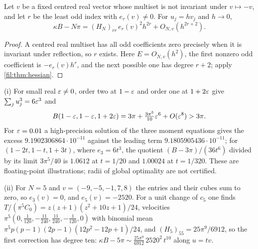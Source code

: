 \begin{corollary}\label{fil:cor:ray}
Let $v$ be a fixed centred real vector whose multiset is not invariant under $v\mapsto-v$, and let $r$ be the least
odd index with $e_r(v)\ne0$. For $u_j=hv_j$ and $h\to0$,
\[
 \kappa B-N\pi=(H_N)_{rr}\,e_r(v)^2h^{2r}+O_{N,v}(h^{2r+2}).
\]
\end{corollary}

\begin{proof}
A centred real multiset has all odd coefficients zero precisely when it is invariant under reflection, so $r$
exists. Here $E=O_{N,v}(h^2)$, the first nonzero odd coefficient is $-e_r(v)h^r$, and the next possible one has degree
$r+2$; apply \cref{fil:thm:hessian}.
\end{proof}

\begin{example}\label{fil:ex:exceptional}
(i) For small real $\varepsilon\ne0$, order two at $1-\varepsilon$ and order one at $1+2\varepsilon$ give $\sum_ju_j^3=6\varepsilon^3$ and
\[
 B(1-\varepsilon,1-\varepsilon,1+2\varepsilon)=3\pi+\tfrac{3\pi^5}{10}\varepsilon^6+O(\varepsilon^8)>3\pi .
\]
For $\varepsilon=0.01$ a high-precision solution of the three moment equations gives the excess
$9.1902306864\cdot10^{-11}$ against the leading term $9.1805905436\cdot10^{-11}$; for $(1-2t,1-t,1+3t)$, where $e_3=6t^3$, the
quotient $(B-3\pi)/(36t^6)$ divided by its limit $3\pi^5/40$ is $1.0612$ at $t=1/20$ and $1.00024$ at $t=1/320$. These are
floating-point illustrations; radii of global optimality are not certified.

(ii) For $N=5$ and $v=(-9,-5,-1,7,8)$ the entries and their cubes sum to zero, so $e_3(v)=0$, and $e_5(v)=-2520$. For a
unit change of $c_5$ one finds $T/(\pi^5C_0)=z(z+1)(z^2+10z+1)/24$, velocities $\pi^5(0,\tfrac1{120},-\tfrac{11}{240},\tfrac{11}{240},-\tfrac1{120},0)$
with binomial mean $\pi^5p(p-1)(2p-1)(12p^2-12p+1)/24$, and $(H_5)_{55}=25\pi^9/6912$, so the first correction has degree ten:
$\kappa B-5\pi\sim\frac{25\pi^9}{6912}\,2520^2\,t^{10}$ along $u=tv$.


\end{example}
